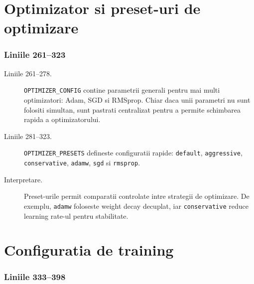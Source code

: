 \documentclass[12pt,a4paper]{report}
\newcommand{\codechunk}[2]{%
\subsection*{Liniile #1--#2}

}
\begin{document}
\chapter{Optimizator si preset-uri de optimizare}

\codechunk{261}{323}

\begin{description}
    \item[Liniile 261--278.] \texttt{OPTIMIZER\_CONFIG} contine parametrii generali
    pentru mai multi optimizatori: Adam, SGD si RMSprop. Chiar daca unii parametri
    nu sunt folositi simultan, sunt pastrati centralizat pentru a permite schimbarea
    rapida a optimizatorului.

    \item[Liniile 281--323.] \texttt{OPTIMIZER\_PRESETS} defineste configuratii
    rapide: \texttt{default}, \texttt{aggressive}, \texttt{conservative},
    \texttt{adamw}, \texttt{sgd} si \texttt{rmsprop}.

    \item[Interpretare.] Preset-urile permit comparatii controlate intre strategii
    de optimizare. De exemplu, \texttt{adamw} foloseste weight decay decuplat, iar
    \texttt{conservative} reduce learning rate-ul pentru stabilitate.
\end{description}

\chapter{Configuratia de training}

\codechunk{333}{398}
\end{document}
